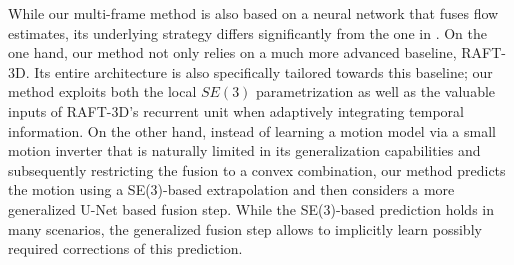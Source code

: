 \documentclass[10pt,twocolumn,letterpaper]{article}
\begin{document}
While our multi-frame method is also based on a neural network that fuses flow
estimates,
its underlying strategy differs significantly 
from the one in
\cite{Schuster2021_DTF}.
On the one hand, our method not only relies on a much more advanced baseline, \ie RAFT-3D. Its entire architecture is also specifically tailored towards this baseline; \eg our method exploits both the local $SE(3)$ parametrization as well as the valuable inputs of RAFT-3D's recurrent unit when adaptively integrating temporal information.
On the other hand, instead of learning a motion model via a small motion inverter that is naturally limited in its generalization capabilities and subsequently restricting the fusion to a convex combination, our method predicts the motion using a SE(3)-based extrapolation and then considers a more generalized U-Net based fusion step. 
While the SE(3)-based prediction holds in many scenarios, the generalized fusion step allows to implicitly learn possibly required corrections of this prediction. 
\end{document}
